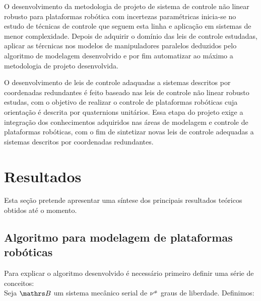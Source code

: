 \documentclass[a4paper,11pt,brazil,fleqn]{article}
\begin{document}
O desenvolvimento da metodologia de projeto de sistema de controle n\~ao linear robusto para plataformas rob\'otica com incertezas param\'etricas inicia-se no estudo de t\'ecnicas de controle que seguem esta linha e aplica\c{c}\~ao em sistemas de menor complexidade. Depois de adquirir o dom\'inio das leis de controle estudadas, aplicar as t\'ercnicas nos modelos de manipuladores paralelos deduzidos pelo algoritmo de modelagem desenvolvido e por fim automatizar ao m\'aximo a metodologia de projeto desenvolvida.

O desenvolvimento de leis de controle adaquadas a sistemas descritos por coordenadas redundantes \'e feito baseado nas leis de controle n\~ao linear robusto estudas, com o objetivo de realizar o controle de plataformas rob\'oticas cuja orienta\c{c}\~ao \'e descrita por quaternions unit\'arios. Essa etapa do projeto exige a integra\c{c}\~ao dos conhecimentos adquiridos nas \'areas de modelagem e controle de plataformas rob\'oticas, com o fim de sintetizar novas leis de controle adequadas a sistemas descritos por coordenadas redundantes.


\section{Resultados}\label{S04}

Esta se\c{c}\~ao pretende apresentar uma s\'intese dos principais resultados te\'oricos obtidos at\'e o momento.

\subsection{Algoritmo para modelagem de plataformas rob\'oticas}\label{S04-1}

Para explicar o algoritmo desenvolvido \'e necess\'ario primeiro definir uma s\'erie de conceitos: \\

Seja $\ssB$ um sistema mec\^anico serial de $\nu^{\scriptscriptstyle \#}$ graus de liberdade. Definimos:
\end{document}
